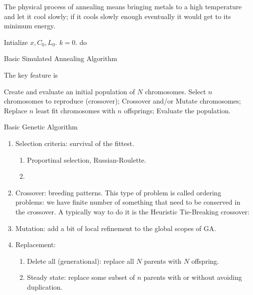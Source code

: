 \documentclass{school-22.211-notes}
\begin{document}
\clearpage
{}
The physical process of annealing means bringing metals to a high temperature and let it cool slowly; if it cools slowly enough eventually it would get to its minimum energy. 
\begin{algorithm}
  \begin{algorithmic}
    \STATE Intialize $x, C_0, L_0$.  $k=0$. 
    \STATE do 
    \ENDWHILE
  \end{algorithmic}
  \caption{Basic Simulated Annealing Algorithm}
\end{algorithm}
The key feature is 


\clearpage
{}
\begin{algorithm}
  \begin{algorithmic}
    \STATE Create and evaluate an initial population of $N$ chromosomes.
    \STATE Select $n$ chromosomes to reproduce (crossover); 
    \STATE Crossover and/or Mutate chromosomes;
    \STATE Replace $n$ least fit chromosomes with $n$ offsprings;
    \STATE Evaluate the population.
    \ENDWHILE
  \end{algorithmic}
  \caption{Basic Genetic Algorithm}
\end{algorithm}

\begin{enumerate}
\item  Selection criteria: survival of the fittest. 
  \begin{enumerate}
  \item Proportinal selection, Russian-Roulette. 
  \item 
  \end{enumerate}

\item Crossover: breeding patterns. This type of problem is called ordering problems: we have finite number of something that need to be conserved in the crossover. A typically way to do it is the Heuristic Tie-Breaking crossover: 

\item Mutation: add a bit of local refinement to the global scopes of GA. 

\item Replacement: 
  \begin{enumerate}
    \item Delete all (generational): replace all $N$ parents with $N$ offspring.    \item Steady state: replace some subset of $n$ parents with or without avoiding duplication.
  \end{enumerate}
\end{enumerate}
\end{document}
